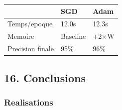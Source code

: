 \documentclass[
  letterpaper,
  DIV=11,
  numbers=noendperiod]{scrartcl}
\newcounter{none} %
\begin{document}
{\def\LTcaptype{none}
\begin{longtable}[]{@{}lll@{}}
\toprule\noalign{}
& SGD & Adam \\
\midrule\noalign{}
\endhead
\bottomrule\noalign{}
\endlastfoot
Temps/epoque & 12.0s & 12.3s \\
Memoire & Baseline & +2$\times$W \\
Precision finale & 95\% & 96\% \\
\end{longtable}
}

\subsection{16. Conclusions}\label{conclusions}

\subsubsection{Realisations}\label{realisations}
\end{document}

